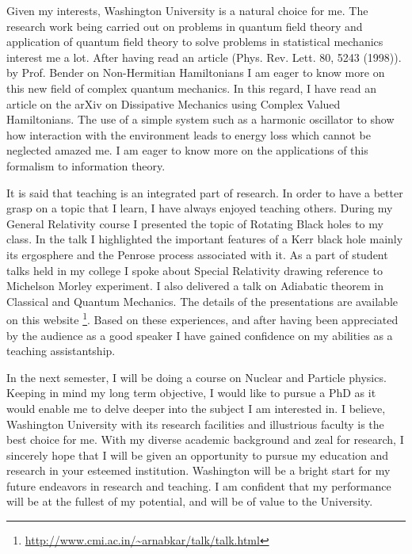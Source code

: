 \documentclass[12pt,a4paper,oneside]{amsart}
\begin{document}
Given my interests, Washington University is a natural choice for me. The research work being carried out on problems in quantum field theory and application of quantum field theory to solve problems in statistical mechanics interest me a lot. After having read an article (Phys. Rev. Lett. 80, 5243 (1998)). by Prof. Bender on Non-Hermitian Hamiltonians I am eager to know more on  this new field of complex quantum mechanics. In this regard, I have read an article on the arXiv on Dissipative Mechanics using Complex Valued Hamiltonians. The use of a simple system such as a harmonic oscillator to show how interaction with the environment leads to energy loss which cannot be neglected amazed me. I am eager to know more on the applications of this formalism to information theory. 

It is said that teaching is an integrated part of research. In order to have a better grasp on a topic that I learn, I have always enjoyed teaching others. During my General Relativity course I presented the topic of Rotating Black holes to my class. In the talk I highlighted the important features of a Kerr black hole mainly its ergosphere and the Penrose process associated with it. As a part of student talks held in my college I spoke about Special Relativity drawing reference to Michelson Morley experiment. I also delivered a talk on Adiabatic theorem in Classical and Quantum Mechanics. The details of the presentations are available on this website \footnote{\url{http://www.cmi.ac.in/~arnabkar/talk/talk.html}}. Based on these experiences, and after having been appreciated by the audience as a good speaker I have gained confidence on my abilities as a teaching assistantship.

In the next semester, I will be doing a course on Nuclear and Particle physics. Keeping in mind my long term objective, I would like to pursue a PhD as it would enable me to delve deeper into the subject I am interested in. I believe, Washington University with its research facilities and illustrious faculty is the best choice for me. With my diverse academic background and zeal for research, I sincerely hope that I will be given an opportunity to pursue my education and research in your esteemed institution. Washington will be a bright start for my future endeavors in research and teaching. I am confident that my performance will be at the fullest of my potential, and will be of value to the University.
\end{document}
